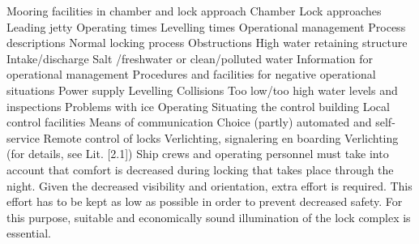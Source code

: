 \newline \indent Mooring facilities in chamber and lock approach
Chamber
Lock approaches
Leading jetty
\newline \indent Operating times
\newline \indent Levelling times
\newline \indent Operational management
Process descriptions
Normal locking process
Obstructions
High water retaining structure
Intake/discharge
Salt /freshwater or clean/polluted water
Information for operational management
Procedures and facilities for negative operational situations
Power supply
Levelling%
Collisions
Too low/too high water levels and inspections
Problems with ice
\newline \indent Operating
Situating the control building
Local control facilities
Means of communication
Choice (partly) automated and self-service
Remote control of locks
\newline \indent Verlichting, signalering en boarding
Verlichting (for details, see Lit. [2.1])
Ship crews and operating personnel must take into account that comfort is decreased during locking that
takes place through the night. Given the decreased visibility and orientation, extra effort is required. This
effort has to be kept as low as possible in order to prevent decreased safety. For this purpose, suitable
and economically sound illumination of the lock complex is essential.
